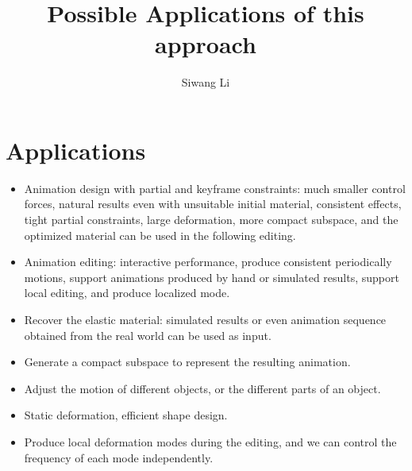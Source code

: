 \documentclass[9pt]{extarticle}
\author{Siwang Li}
\title{Possible Applications of this approach}
\begin{document}
\maketitle

\setlength{\parskip}{0.5ex}

\section{Applications}
\begin{itemize}
\item Animation design with partial and keyframe constraints: much smaller
  control forces, natural results even with unsuitable initial material,
  consistent effects, tight partial constraints, large deformation, more compact
  subspace, and the optimized material can be used in the following editing.
\item Animation editing: interactive performance, produce consistent
  periodically motions, support animations produced by hand or simulated
  results, support local editing, and produce localized mode.
\item Recover the elastic material: simulated results or even animation sequence
  obtained from the real world can be used as input.
\item Generate a compact subspace to represent the resulting animation.
\item Adjust the motion of different objects, or the different parts of an
  object.
\item Static deformation, efficient shape design.
\item Produce local deformation modes during the editing, and we can control
  the frequency of each mode independently.
\end{itemize}
\end{document}
